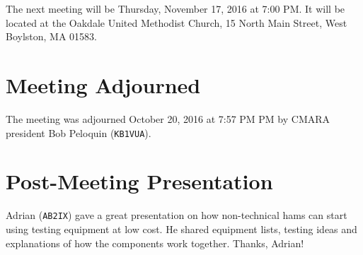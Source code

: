 \documentclass[10pt,letterpaper]{article}
\begin{document}
The next meeting will be Thursday, November 17, 2016 at 7:00 PM. It will be located at the Oakdale United Methodist Church, 15 North Main Street, West Boylston, MA 01583.

\section{Meeting Adjourned}
The meeting was adjourned October 20, 2016 at 7:57 PM PM by CMARA president Bob Peloquin (\texttt{KB1VUA}).

\section{Post-Meeting Presentation}

Adrian (\texttt{AB2IX}) gave a great presentation on how non-technical hams can start using testing equipment at low cost. He shared equipment lists, testing ideas and explanations of how the components work together. Thanks, Adrian!
\end{document}
